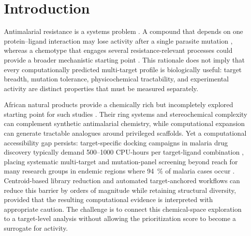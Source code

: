 \documentclass[journal=jcisd8,manuscript=article]{achemso}
\begin{document}
\section{Introduction}\label{sec:intro}
Antimalarial resistance is a systems problem \cite{WHO2024MalariaReport,Ariey2014,Ashley2018}. A compound that depends on one protein--ligand interaction may lose activity after a single parasite mutation \cite{Fidock2000}, whereas a chemotype that engages several resistance-relevant processes could provide a broader mechanistic starting point \cite{Wells2015,SiqueiraNeto2023,Ryszkiewicz2026MTDL,Trapotsi2022MoA}. This rationale does not imply that every computationally predicted multi-target profile is biologically useful: target breadth, mutation tolerance, physicochemical tractability, and experimental activity are distinct properties that must be measured separately.

African natural products provide a chemically rich but incompletely explored starting point for such studies \cite{Newman2007,NtieKang2018,Simoben2023,Cheuka2020}. Their ring systems and stereochemical complexity can complement synthetic antimalarial chemistry, while computational expansion can generate tractable analogues around privileged scaffolds. Yet a computational accessibility gap persists: target-specific docking campaigns in malaria drug discovery typically demand \numrange{500}{1000} CPU-hours per target-ligand combination \cite{Trott2009,Eberhardt2021}, placing systematic multi-target and mutation-panel screening beyond reach for many research groups in endemic regions where \qty{94}{\percent} of malaria cases occur \cite{WHO2024MalariaReport}. Centroid-based library reduction and automated target-anchored workflows can reduce this barrier by orders of magnitude while retaining structural diversity, provided that the resulting computational evidence is interpreted with appropriate caution. The challenge is to connect this chemical-space exploration to a target-level analysis without allowing the prioritization score to become a surrogate for activity.
\end{document}
